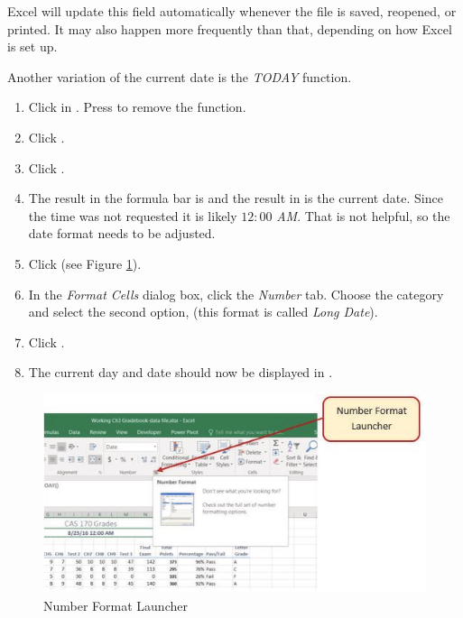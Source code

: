 Excel will update this field automatically whenever the file is saved, reopened, or printed. It may also happen more frequently than that, depending on how Excel is set up.

Another variation of the current date is the \textit{TODAY} function.

\begin{enumbox}
	\begin{enumerate}
		\item Click in . Press  to remove the  function.
		\item Click . 
		\item Click .
		\item The result in the formula bar is  and the result in  is the current date. Since the time was not requested it is likely $ 12\!:\!00 $\textit{ AM}. That is not helpful, so the date format needs to be adjusted.
		\item Click  (see Figure \ref{03:fig17}).
		\item In the \textit{Format Cells} dialog box, click the \textit{Number} tab. Choose the  category and select the second option,  (this format is called \textit{Long Date}).
		\item Click .
		\item The current day and date should now be displayed in .
	\end{enumerate}
\end{enumbox}
	
\begin{figure}[H]
	\centering
	\includegraphics[width=\maxwidth{.95\linewidth}]{gfx/ch03_fig17}
	\caption{Number Format Launcher}
	\label{03:fig17}
\end{figure}

